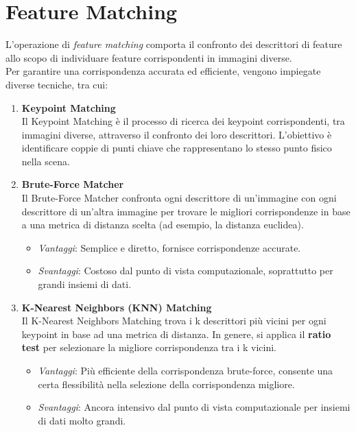 \documentclass[12pt,a4paper,openright,twoside]{book}
\begin{document}
\section{Feature Matching}
L'operazione di {\itshape feature matching} comporta il confronto dei descrittori di feature allo scopo di individuare feature corrispondenti in immagini diverse. \\
Per garantire una corrispondenza accurata ed efficiente, vengono impiegate diverse tecniche, tra cui:

\begin{enumerate}

\item \textbf{Keypoint Matching}\\
Il Keypoint Matching è il processo di ricerca dei keypoint corrispondenti, tra immagini diverse, attraverso il confronto dei loro descrittori. L'obiettivo è identificare coppie di punti chiave che rappresentano lo stesso punto fisico nella scena.

\item \textbf{Brute-Force Matcher}\\
Il Brute-Force Matcher confronta ogni descrittore di un'immagine con ogni descrittore di un'altra immagine per trovare le migliori corrispondenze in base a una metrica di distanza scelta (ad esempio, la distanza euclidea).
\begin{itemize}
\item {\itshape Vantaggi}: Semplice e diretto, fornisce corrispondenze accurate.
\item {\itshape Svantaggi}: Costoso dal punto di vista computazionale, soprattutto per grandi insiemi di dati.
\end{itemize}

\item \textbf{K-Nearest Neighbors (KNN) Matching}\\
Il K-Nearest Neighbors Matching trova i k descrittori più vicini per ogni keypoint in base ad una metrica di distanza. In genere, si applica il \textbf{ratio test} per selezionare la migliore corrispondenza tra i k vicini.
\begin{itemize}
\item {\itshape Vantaggi}: Più efficiente della corrispondenza brute-force, consente una certa flessibilità nella selezione della corrispondenza migliore.
\item {\itshape Svantaggi}: Ancora intensivo dal punto di vista computazionale per insiemi di dati molto grandi.
\end{itemize}


\end{enumerate}
\end{document}
